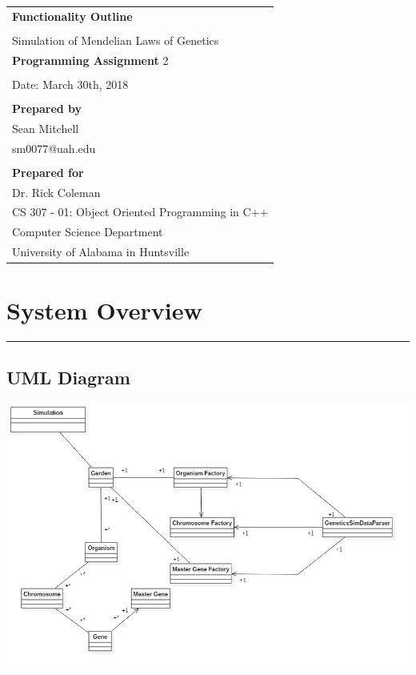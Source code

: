 \documentclass{article}
\begin{document}
\begin{center}
\begin{tabular}{l}

\textbf{Functionality Outline}\\
\\
Simulation of Mendelian Laws of Genetics\\
\textbf{Programming Assignment} 2\\
\\

Date: March 30th, 2018\\
\\
\textbf{Prepared by}\\
Sean Mitchell\\
sm0077@uah.edu\\
\\

\textbf{Prepared for}\\
Dr. Rick Coleman\\
CS 307 - 01: Object Oriented Programming in C++\\
Computer Science Department\\
University of Alabama in Huntsville\\

\end{tabular}
\end{center}

\newpage
\setcounter{tocdepth}{4}
\setcounter{secnumdepth}{4}
\tableofcontents
\newpage

\section{System Overview}
\hrule
\subsection{UML Diagram}
\begin{center}
\begin{minipage}{\textwidth}
\includegraphics[width=1\linewidth]{Main.png}
\end{minipage}
\end{center}
\end{document}
